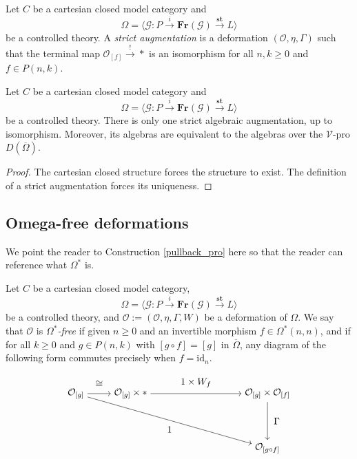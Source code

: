 \documentclass{tac}
\begin{document}
\begin{definition}
Let $C$ be a cartesian closed model category and 
\[
\Omega=\langle \mathcal{G}:P\xrightarrow{i}\mathbf{Fr}(\mathcal{G})\xrightarrow{\mathbf{st}}L\rangle
\]
be a controlled theory. A \emph{strict augmentation} is a deformation $(\mathcal{O},\eta,\Gamma)$ such that the terminal map $\mathcal{O}_{[f]}\xrightarrow{!}*$ is an isomorphism for all $n,k\geq 0$ and $f\in P(n,k)$.
\end{definition}
\begin{proposition}
    Let $C$ be a cartesian closed model category and 
\[
\Omega=\langle \mathcal{G}:P\xrightarrow{i}\mathbf{Fr}(\mathcal{G})\xrightarrow{\mathbf{st}}L\rangle
\]
be a controlled theory. There is only one strict algebraic augmentation, up to isomorphism. Moreover, its algebras are equivalent to the algebras over the $\mathcal{V}$-pro $D(\overline{\Omega})$.
\end{proposition}

\begin{proof}
The cartesian closed structure forces the structure to exist. The definition of a strict augmentation forces its uniqueness.
\end{proof}

\subsection{Omega-free deformations}
We point the reader to Construction \ref{pullback_pro} here so that the reader can reference what $\Omega^*$ is.

\begin{definition}
Let $C$ be a cartesian closed model category,
\[
\Omega=\langle \mathcal{G}:P\xrightarrow{i}\mathbf{Fr}(\mathcal{G})\xrightarrow{\mathbf{st}}L\rangle
\]
be a controlled theory, and $\mathcal{O}:=(\mathcal{O},\eta,\Gamma,W)$ be a deformation of $\Omega$. We say that $\mathcal{O}$ is \emph{$\Omega^*$-free} if given $n\geq 0$ and an invertible morphism $f\in\Omega^*(n,n)$, and if for all $k\geq 0$ and $g\in P(n,k)$ with $[g\circ f]=[g]$ in $\overline{\Omega}$, any diagram of the following form commutes precisely when $f=\text{id}_n$.

\begin{equation}\label{equat_for_freeness}
   \begin{tikzpicture}[node distance=2cm, auto]
        \node (A) {$\mathcal{O}_{[g]}$};
       \node (B)[right of=A]{$\mathcal{O}_{[g]}\times *$};
       \node (C)[right of=B,node distance=5cm]{$\mathcal{O}_{[g]}\times \mathcal{O}_{[f]}$};
       \node (D)[below of=C]{$\mathcal{O}_{[g\circ f]}$};
       \draw[->] (A) to node[above=3]{$\cong$}(B);
       \draw[->] (B) to node[above=3]{$1\times W_{f}$}(C);
       \draw[->](C) to node[right=3]{$\Gamma$}(D);
       \draw[->](A) to node[below=3]{$1$} (D);
    \end{tikzpicture} 
\end{equation}
\end{definition}
\end{document}
